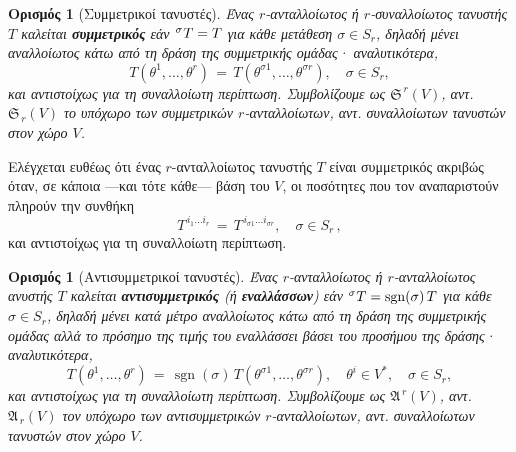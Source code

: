 \documentclass[11pt,a4paper,twoside,openright]{book}
\newtheorem{definition}[lemma]{Ορισμός}
\begin{document}
\begin{definition}[Συμμετρικοί τανυστές]\label{def:symmetric-tensor}
Ένας $r$-ανταλλοίωτος ή $r$-συναλλοίωτος
τανυστής $Τ$ καλείται \textbf{συμμετρικός}
εάν ${}^\sigma\hspace{.25pt}{T}=T$ για κάθε μετάθεση $\sigma \in S_r$, δηλαδή μένει αναλλοίωτος κάτω από τη δράση της συμμετρικής ομάδας· αναλυτικότερα,
\begin{equation}\label{eq:symmetric-contravariant-tensor}
{T}(\theta^1, \dots, \theta^r)
\,=\,
T(\theta^{\sigma 1}, \dots, \theta^{\sigma r}),
\quad
\sigma \in S_r,
\end{equation}
και αντιστοίχως για τη συναλλοίωτη περίπτωση.
Συμβολίζουμε ως $\mathfrak{S}^{\,r}(V)$, αντ. $\mathfrak{S}_{\,r}(V)$ το υπόχωρο των συμμετρικών $r$-ανταλλοίωτων, αντ. συναλλοίωτων τανυστών στον χώρο $V$.
\end{definition}
\noindent
Ελέγχεται ευθέως ότι ένας $r$-ανταλλοίωτος τανυστής $Τ$ είναι συμμετρικός ακριβώς όταν, σε κάποια ---και τότε κάθε---
βάση του $V$, οι ποσότητες που τον αναπαριστούν πληρούν την συνθήκη
\begin{equation}\label{eq:symmetric-contravariant-tensor-quantities}
Τ^{\,i_1 \dots i_r}
\,=\,
Τ^{\,i_{\sigma 1} \dots i_{\sigma r}},
\quad
\sigma \in S_r\,,
\end{equation}
και αντιστοίχως για τη συναλλοίωτη περίπτωση.
\begin{definition}[Αντισυμμετρικοί τανυστές]\label{def:antisymmetric-tensor}
Ένας $r$-ανταλλοίωτος ή $r$-ανταλλοίωτος ανυστής $Τ$ καλείται \textbf{αντισυμμετρικός}
(ή \textbf{εναλλάσσων})
εάν ${}^\sigma\hspace{.25pt}{T}=\operatorname{sgn}(\sigma)\,T$ για κάθε $\sigma \in S_r$,
δηλαδή μένει κατά μέτρο αναλλοίωτος κάτω από τη δράση της συμμετρικής ομάδας αλλά το πρόσημο της τιμής του εναλλάσσει βάσει του προσήμου της δράσης·
αναλυτικότερα,
\begin{equation}\label{eq:antisymmetric-contravariant-tensor}
{T}(\theta^1, \dots, \theta^r)
\,=\,
\operatorname{sgn}(\sigma)
\,
T(\theta^{\sigma 1}, \dots, \theta^{\sigma r}),
\quad
\theta^i \in V^*,
\quad
\sigma \in S_r,
\end{equation}
και αντιστοίχως για τη συναλλοίωτη περίπτωση.
Συμβολίζουμε ως $\mathfrak{A}^{\,r}(V)$, αντ. $\mathfrak{A}_{\,r}(V)$
τον υπόχωρο των αντισυμμετρικών $r$-ανταλλοίωτων, αντ. συναλλοίωτων τανυστών στον χώρο $V$.
\end{definition}
\end{document}
